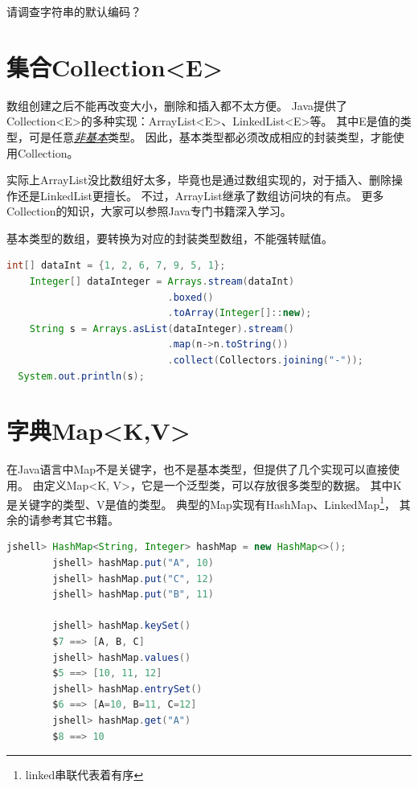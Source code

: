 \begin{exercise}
	请调查字符串的默认编码？
\end{exercise}

\section{集合Collection<E>}
数组创建之后不能再改变大小，删除和插入都不太方便。
Java提供了Collection<E>的多种实现：ArrayList<E>、LinkedList<E>等。
其中E是值的类型，可是任意\underline{\emph{非基本}}类型。
因此，基本类型都必须改成相应的封装类型，才能使用Collection。

实际上ArrayList没比数组好太多，毕竟也是通过数组实现的，对于插入、删除操作还是LinkedList更擅长。
不过，ArrayList继承了数组访问块的有点。
更多Collection的知识，大家可以参照Java专门书籍深入学习。

\begin{example}
	基本类型的数组，要转换为对应的封装类型数组，不能强转赋值。
\end{example}
\begin{lstlisting}[language=Java]
	int[] dataInt = {1, 2, 6, 7, 9, 5, 1};
	Integer[] dataInteger = Arrays.stream(dataInt)
							.boxed()
							.toArray(Integer[]::new);
	String s = Arrays.asList(dataInteger).stream()
							.map(n->n.toString())
							.collect(Collectors.joining("-"));
  System.out.println(s);
\end{lstlisting}



\section{字典Map<K,V>}
	在Java语言中Map不是关键字，也不是基本类型，但提供了几个实现可以直接使用。
	由定义Map<K, V>，它是一个泛型类，可以存放很多类型的数据。
	其中K是关键字的类型、V是值的类型。
	典型的Map实现有HashMap、LinkedMap\footnote{linked串联代表着有序}，
	其余的请参考其它书籍。

	\begin{lstlisting}[language=Java, backgroundcolor=\color{lightgray!10}]
		jshell> HashMap<String, Integer> hashMap = new HashMap<>();
		jshell> hashMap.put("A", 10)
		jshell> hashMap.put("C", 12)
		jshell> hashMap.put("B", 11)

		jshell> hashMap.keySet()
		$7 ==> [A, B, C]
		jshell> hashMap.values()
		$5 ==> [10, 11, 12]
		jshell> hashMap.entrySet()
		$6 ==> [A=10, B=11, C=12]
		jshell> hashMap.get("A")
		$8 ==> 10
	\end{lstlisting}

